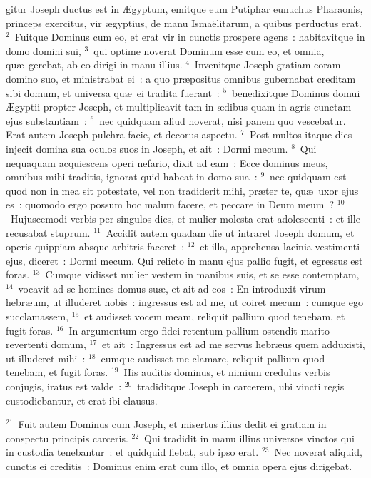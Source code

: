 \bchapter
{}gitur Joseph ductus est in \AE gyptum, emitque eum Putiphar eunuchus Pharaonis, princeps exercitus, vir \ae gyptius, de manu Isma\"elitarum, a quibus perductus erat.
${}^{2}$~Fuitque Dominus cum eo, et erat vir in cunctis prospere agens~: habitavitque in domo domini sui,
${}^{3}$~qui optime noverat Dominum esse cum eo, et omnia, qu\ae\ gerebat, ab eo dirigi in manu illius.
${}^{4}$~Invenitque Joseph gratiam coram domino suo, et ministrabat ei~: a quo pr\ae positus omnibus gubernabat creditam sibi domum, et universa qu\ae\ ei tradita fuerant~:
${}^{5}$~benedixitque Dominus domui \AE gyptii propter Joseph, et multiplicavit tam in \ae dibus quam in agris cunctam ejus substantiam~:
${}^{6}$~nec quidquam aliud noverat, nisi panem quo vescebatur. Erat autem Joseph pulchra facie, et decorus aspectu.
${}^{7}$~Post multos itaque dies injecit domina sua oculos suos in Joseph, et ait~: Dormi mecum.
${}^{8}$~Qui nequaquam acquiescens operi nefario, dixit ad eam~: Ecce dominus meus, omnibus mihi traditis, ignorat quid habeat in domo sua~:
${}^{9}$~nec quidquam est quod non in mea sit potestate, vel non tradiderit mihi, pr\ae ter te, qu\ae\ uxor ejus es~: quomodo ergo possum hoc malum facere, et peccare in Deum meum~?
${}^{10}$~Hujuscemodi verbis per singulos dies, et mulier molesta erat adolescenti~: et ille recusabat stuprum.
${}^{11}$~Accidit autem quadam die ut intraret Joseph domum, et operis quippiam absque arbitris faceret~:
${}^{12}$~et illa, apprehensa lacinia vestimenti ejus, diceret~: Dormi mecum. Qui relicto in manu ejus pallio fugit, et egressus est foras.
${}^{13}$~Cumque vidisset mulier vestem in manibus suis, et se esse contemptam,
${}^{14}$~vocavit ad se homines domus su\ae , et ait ad eos~: En introduxit virum hebr\ae um, ut illuderet nobis~: ingressus est ad me, ut coiret mecum~: cumque ego succlamassem,
${}^{15}$~et audisset vocem meam, reliquit pallium quod tenebam, et fugit foras.
${}^{16}$~In argumentum ergo fidei retentum pallium ostendit marito revertenti domum,
${}^{17}$~et ait~: Ingressus est ad me servus hebr\ae us quem adduxisti, ut illuderet mihi~:
${}^{18}$~cumque audisset me clamare, reliquit pallium quod tenebam, et fugit foras.
${}^{19}$~His auditis dominus, et nimium credulus verbis conjugis, iratus est valde~:
${}^{20}$~tradiditque Joseph in carcerem, ubi vincti regis custodiebantur, et erat ibi clausus.


${}^{21}$~Fuit autem Dominus cum Joseph, et misertus illius dedit ei gratiam in conspectu principis carceris.
${}^{22}$~Qui tradidit in manu illius universos vinctos qui in custodia tenebantur~: et quidquid fiebat, sub ipso erat.
${}^{23}$~Nec noverat aliquid, cunctis ei creditis~: Dominus enim erat cum illo, et omnia opera ejus dirigebat.

